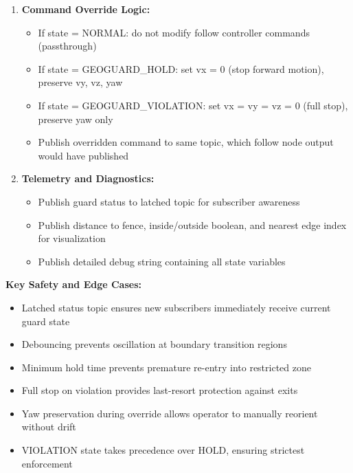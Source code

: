 \documentclass[12pt,a4paper]{report}
\begin{document}
\begin{enumerate}
\begin{itemize}
        \item Enforce minimum hold time (200ms) before transitioning from HOLD/VIOLATION back to NORMAL
    \end{itemize}
    \item \textbf{Command Override Logic:}
    \begin{itemize}
        \item If state = NORMAL: do not modify follow controller commands (passthrough)
        \item If state = GEOGUARD\_HOLD: set vx = 0 (stop forward motion), preserve vy, vz, yaw
        \item If state = GEOGUARD\_VIOLATION: set vx = vy = vz = 0 (full stop), preserve yaw only
        \item Publish overridden command to same topic, which follow node output would have published
    \end{itemize}
    \item \textbf{Telemetry and Diagnostics:}
    \begin{itemize}
        \item Publish guard status to latched topic for subscriber awareness
        \item Publish distance to fence, inside/outside boolean, and nearest edge index for visualization
        \item Publish detailed debug string containing all state variables
    \end{itemize}
\end{enumerate}
\textbf{Key Safety and Edge Cases:}
\begin{itemize}
    \item Latched status topic ensures new subscribers immediately receive current guard state
    \item Debouncing prevents oscillation at boundary transition regions
    \item Minimum hold time prevents premature re-entry into restricted zone
    \item Full stop on violation provides last-resort protection against exits
    \item Yaw preservation during override allows operator to manually reorient without drift
    \item VIOLATION state takes precedence over HOLD, ensuring strictest enforcement
\end{itemize}

\end{document}
